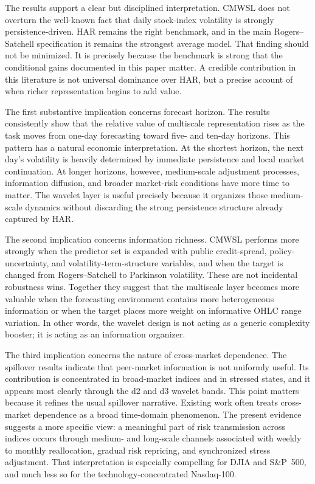 The results support a clear but disciplined interpretation. CMWSL does not overturn the well-known fact that daily stock-index volatility is strongly persistence-driven. HAR remains the right benchmark, and in the main Rogers--Satchell specification it remains the strongest average model. That finding should not be minimized. It is precisely because the benchmark is strong that the conditional gains documented in this paper matter. A credible contribution in this literature is not universal dominance over HAR, but a precise account of when richer representation begins to add value.

The first substantive implication concerns forecast horizon. The results consistently show that the relative value of multiscale representation rises as the task moves from one-day forecasting toward five- and ten-day horizons. This pattern has a natural economic interpretation. At the shortest horizon, the next day's volatility is heavily determined by immediate persistence and local market continuation. At longer horizons, however, medium-scale adjustment processes, information diffusion, and broader market-risk conditions have more time to matter. The wavelet layer is useful precisely because it organizes those medium-scale dynamics without discarding the strong persistence structure already captured by HAR.

The second implication concerns information richness. CMWSL performs more strongly when the predictor set is expanded with public credit-spread, policy-uncertainty, and volatility-term-structure variables, and when the target is changed from Rogers--Satchell to Parkinson volatility. These are not incidental robustness wins. Together they suggest that the multiscale layer becomes more valuable when the forecasting environment contains more heterogeneous information or when the target places more weight on informative OHLC range variation. In other words, the wavelet design is not acting as a generic complexity booster; it is acting as an information organizer.

The third implication concerns the nature of cross-market dependence. The spillover results indicate that peer-market information is not uniformly useful. Its contribution is concentrated in broad-market indices and in stressed states, and it appears most clearly through the d2 and d3 wavelet bands. This point matters because it refines the usual spillover narrative. Existing work often treats cross-market dependence as a broad time-domain phenomenon. The present evidence suggests a more specific view: a meaningful part of risk transmission across indices occurs through medium- and long-scale channels associated with weekly to monthly reallocation, gradual risk repricing, and synchronized stress adjustment. That interpretation is especially compelling for DJIA and S\&P~500, and much less so for the technology-concentrated Nasdaq-100.

